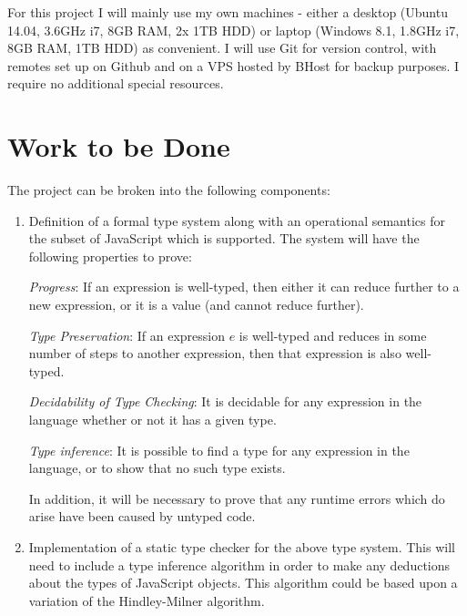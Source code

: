 \documentclass{article}
\begin{document}
		For this project I will mainly use my own machines - either a desktop (Ubuntu 14.04, 3.6GHz i7, 8GB RAM, 2x 1TB HDD) or laptop (Windows 8.1, 1.8GHz i7, 8GB RAM, 1TB HDD) as convenient. I will use Git for version control, with remotes set up on Github and on a VPS hosted by BHost for backup purposes. I require no additional special resources.
				
	\section{Work to be Done}\label{work-to-be-done}

		The project can be broken into the following components:
		\begin{enumerate}\def\labelenumi{\arabic{enumi}.}
		 \item Definition of a formal type system along with an operational semantics for the subset of JavaScript which is supported. The system will have the following properties to prove:   
			
			\emph{Progress}: If an expression is well-typed, then either it can reduce further to a new expression, or it is a value (and cannot reduce further). 

			\emph{Type Preservation}: If an expression $e$ is well-typed and reduces in some number of steps to another expression, then that expression is also well-typed.
			
			\emph{Decidability of Type Checking}: It is decidable for any expression in the language whether or not it has a given type.
			
			\emph{Type inference}: It is possible to find a type for any expression in the language, or to show that no such type exists.

		 In addition, it will be necessary to prove that any runtime errors which do arise have been caused by untyped code.
		 
		 \item Implementation of a static type checker for the above type system. This will need to include a type inference algorithm in order to make any deductions about the types of JavaScript objects. This algorithm could be based upon a variation of the Hindley-Milner algorithm.
		 

\end{enumerate}
\end{document}
